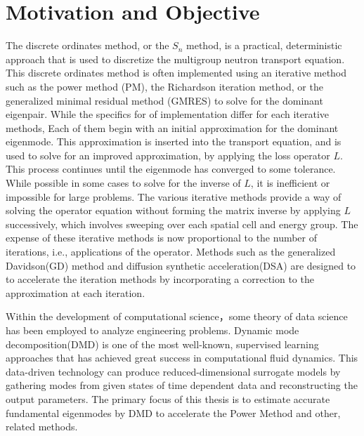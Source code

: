 \section{Motivation and Objective}
The discrete ordinates method, or the $S_n$ method\cite{lewis1984computational}, is a practical, deterministic approach that is used to discretize the  multigroup neutron transport equation.
This discrete ordinates method is often implemented using an iterative method such as the power method (PM), the Richardson iteration method\cite{adams1993two}, or the generalized minimal residual method (GMRES)\cite{saad1986gmres} to solve for the dominant eigenpair. 
While the specifics for of implementation differ for each iterative methods, Each of them begin with an initial approximation for the dominant eigenmode.
This approximation is inserted into the transport equation, and is used to solve for an improved approximation, by applying the loss operator $L$.
This process continues until the eigenmode has converged to some tolerance.
While possible in some cases to solve for the inverse of $L$, it is inefficient or impossible for large problems.
The various iterative methods provide a way of solving the operator equation without forming the matrix inverse by applying $L$ successively, which involves sweeping over each spatial cell and energy group.  
The expense of these iterative methods is now proportional to the number of iterations, i.e., applications of the operator.
Methods such as the generalized Davidson(GD) method\cite{larsen1984diffusion} and diffusion synthetic acceleration(DSA)\cite{hamilton2011numerical} are designed to to accelerate the iteration methods by incorporating a correction to the approximation at each iteration.

Within the development of computational science，some theory of data science has been employed to analyze engineering problems.
Dynamic mode decomposition(DMD) is one of the most well-known, supervised learning approaches that has achieved great success in computational fluid dynamics.
This data-driven technology can produce reduced-dimensional surrogate models by gathering modes from given states of time dependent data and reconstructing the output parameters.
The primary focus of this thesis is to estimate accurate fundamental eigenmodes by DMD to accelerate the Power Method and other, related methods.

